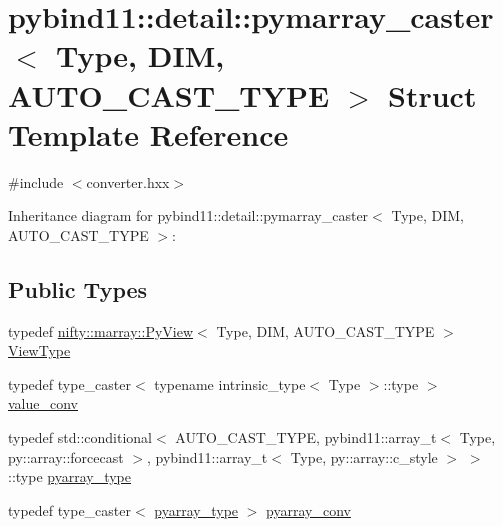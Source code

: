 \hypertarget{structpybind11_1_1detail_1_1pymarray__caster}{}\section{pybind11\+:\+:detail\+:\+:pymarray\+\_\+caster$<$ Type, D\+I\+M, A\+U\+T\+O\+\_\+\+C\+A\+S\+T\+\_\+\+T\+Y\+P\+E $>$ Struct Template Reference}
\label{structpybind11_1_1detail_1_1pymarray__caster}


{\ttfamily \#include $<$converter.\+hxx$>$}



Inheritance diagram for pybind11\+:\+:detail\+:\+:pymarray\+\_\+caster$<$ Type, D\+I\+M, A\+U\+T\+O\+\_\+\+C\+A\+S\+T\+\_\+\+T\+Y\+P\+E $>$\+:
\subsection*{Public Types}
\begin{DoxyCompactItemize}
\item 
typedef \hyperlink{classnifty_1_1marray_1_1PyView}{nifty\+::marray\+::\+Py\+View}$<$ Type, D\+I\+M, A\+U\+T\+O\+\_\+\+C\+A\+S\+T\+\_\+\+T\+Y\+P\+E $>$ \hyperlink{structpybind11_1_1detail_1_1pymarray__caster_a0593b33c0ed08f1b25b34dbc3da1b01c}{View\+Type}
\item 
typedef type\+\_\+caster$<$ typename intrinsic\+\_\+type$<$ Type $>$\+::type $>$ \hyperlink{structpybind11_1_1detail_1_1pymarray__caster_aa57421c8e7e64ab62bac67897f864ea1}{value\+\_\+conv}
\item 
typedef std\+::conditional$<$ A\+U\+T\+O\+\_\+\+C\+A\+S\+T\+\_\+\+T\+Y\+P\+E, pybind11\+::array\+\_\+t$<$ Type, py\+::array\+::forcecast $>$, pybind11\+::array\+\_\+t$<$ Type, py\+::array\+::c\+\_\+style $>$ $>$\+::type \hyperlink{structpybind11_1_1detail_1_1pymarray__caster_a70ad611a7f6fd17d02b461c43dff6ea0}{pyarray\+\_\+type}
\item 
typedef type\+\_\+caster$<$ \hyperlink{structpybind11_1_1detail_1_1pymarray__caster_a70ad611a7f6fd17d02b461c43dff6ea0}{pyarray\+\_\+type} $>$ \hyperlink{structpybind11_1_1detail_1_1pymarray__caster_a0fe8ba6e31f03c24d130c0dba1a55fa8}{pyarray\+\_\+conv}
\end{DoxyCompactItemize}
